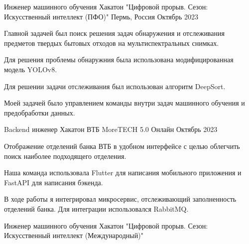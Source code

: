 

\begin{cventries}

\cventry
{Инженер машинного обучения} %
{Хакатон "Цифровой прорыв. Сезон: Искусственный интеллект (ПФО)"} %
{Пермь, Россия} %
{Октябрь 2023} %
{
  \begin{cvitems} %
    \item {Главной задачей был поиск решения задач обнаружения и отслеживания предметов твердых бытовых отходов на мультиспектральных снимках. }
    \item {Для решения проблемы обнаружния была использована модифицированная модель YOLOv8. } 
    \item {Для решении задачи отслеживания был использован алгоритм DeepSort. }
    \item {Моей задачей было управлением команды внутри задач машинного обучения и предобработки данных. }
  \end{cvitems}
}
\cventry
{Backend инженер} %
{Хакатон ВТБ MoreTECH 5.0} %
{Онлайн} %
{Октябрь 2023} %
{
  \begin{cvitems} %
    \item {Отображение отделений банка ВТБ в удобном интерфейсе с целью облегчить поиск наиболее подходящего отделения. }
    \item {Наша команда использовала Flutter для написания мобильного приложения и FastAPI для написания бэкенда. } 
    \item {В ходе работы я интегрировал микросервис, отслеживающий заполненность отделений банка. Для интеграции использовался RabbitMQ. }
  \end{cvitems}
}
\cventry
{Инженер машинного обучения} %
{Хакатон "Цифровой прорыв. Сезон: Искусственный интеллект (Международный)"} %

\end{cventries}

